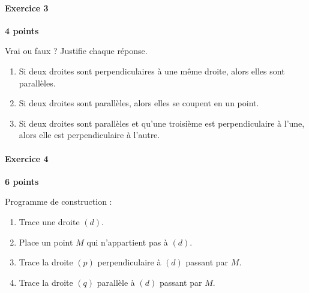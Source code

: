 \documentclass[a4paper,10pt]{report}
\begin{document}
\medskip
\paragraph{Exercice 3} \hfill \textbf{4 points}

\noindent Vrai ou faux ? Justifie chaque réponse.
\begin{enumerate}
\item Si deux droites sont perpendiculaires à une même droite, alors elles sont parallèles.
\item Si deux droites sont parallèles, alors elles se coupent en un point.
\item Si deux droites sont parallèles et qu'une troisième est perpendiculaire à l'une, alors elle est perpendiculaire à l'autre.
\end{enumerate}

\medskip\noindent\grandscarreaux{\linewidth}{4cm}

\medskip
\paragraph{Exercice 4} \hfill \textbf{6 points}

\noindent Programme de construction :
\begin{enumerate}
\item Trace une droite $(d)$.
\item Place un point $M$ qui n'appartient pas à $(d)$.
\item Trace la droite $(p)$ perpendiculaire à $(d)$ passant par $M$.
\item Trace la droite $(q)$ parallèle à $(d)$ passant par $M$.
\end{enumerate}

\medskip\noindent\grandscarreaux{\linewidth}{6cm}
\end{document}
